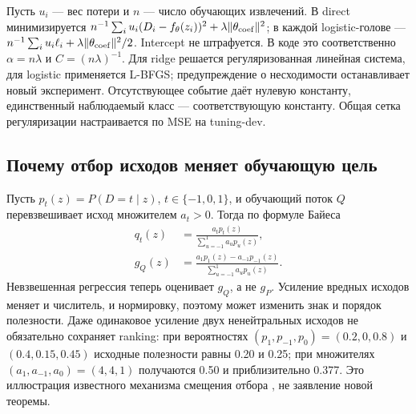 Пусть $u_i$ --- вес потери и $n$ --- число обучающих извлечений.
В direct минимизируется $n^{-1}\sum_i u_i(D_i-f_\theta(z_i))^2+
\lambda\|\theta_{\rm coef}\|^2$; в каждой logistic-голове ---
$n^{-1}\sum_i u_i\ell_i+\lambda\|\theta_{\rm coef}\|^2/2$.
Intercept не штрафуется. В коде это соответственно
$\alpha=n\lambda$ и $C=(n\lambda)^{-1}$.
Для ridge решается регуляризованная линейная система,
для logistic применяется L-BFGS; предупреждение о несходимости
останавливает новый эксперимент. Отсутствующее событие даёт нулевую
константу, единственный наблюдаемый класс --- соответствующую константу.
Общая сетка регуляризации настраивается по MSE на tuning-dev.

\subsection{Почему отбор исходов меняет обучающую цель}
Пусть $p_t(z)=P(D=t\mid z)$, $t\in\{-1,0,1\}$,
и обучающий поток $Q$ перевзвешивает исход множителем $a_t>0$.
Тогда по формуле Байеса
\begin{equation}\label{eq:selection_shift}
\begin{aligned}
q_t(z)&=\frac{a_t p_t(z)}{\sum_{u=-1}^{1}a_u p_u(z)},\\
g_Q(z)&=\frac{a_1p_1(z)-a_{-1}p_{-1}(z)}{\sum_{u=-1}^{1}a_u p_u(z)}.
\end{aligned}
\end{equation}
Невзвешенная регрессия теперь оценивает $g_Q$, а не $g_P$.
Усиление вредных исходов меняет и числитель, и нормировку,
поэтому может изменить знак и порядок полезности.
Даже одинаковое усиление двух ненейтральных исходов не обязательно
сохраняет ranking: при вероятностях $(p_1,p_{-1},p_0)=(0.2,0,0.8)$
и $(0.4,0.15,0.45)$ исходные полезности равны 0.20 и 0.25;
при множителях $(a_1,a_{-1},a_0)=(4,4,1)$ получаются
0.50 и приблизительно 0.377. Это иллюстрация известного механизма
смещения отбора \citep{nyberg2023exploring}, не заявление новой теоремы.

